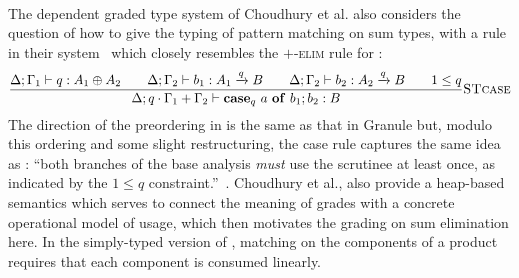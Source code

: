  \paragraph{\gradname{}}
 The dependent graded type system \gradname{} of Choudhury et al. also considers
 the question of how to give the typing of pattern matching on sum
 types, with a rule in their system~\cite[p.8]{choudhury2021} which
 closely resembles the \textsc{$+$-elim} rule for \abname{}:
 \begin{align*}
 \dfrac{
   \Delta ; \Gamma_1 \vdash q : A_1 \oplus A_2
   \qquad
   \Delta ; \Gamma_2 \vdash b_1 : A_1 \xrightarrow{q} B
   \qquad
   \Delta ; \Gamma_2 \vdash b_2 : A_2 \xrightarrow{q} B
   \qquad
   1 \leq q
 }
 {\Delta ; q \cdot \Gamma_1 + \Gamma_2 \vdash \mathbf{case}_q\ a\
   \mathbf{of}\ b_1; b_2 : B}
 \textsc{STcase}
 \end{align*}
 The direction of the preordering in \gradname{} is the same
 as that in Granule but, modulo this ordering and some slight
 restructuring, the case rule
 captures the same idea as \abname{}: ``both branches
 of the base analysis \emph{must} use the scrutinee at least once,
 as indicated by the $1 \leq q$ constraint.''~\cite[p.8]{choudhury2021}.
 Choudhury et al., also provide a heap-based semantics which serves to connect the
 meaning of grades with a concrete operational model of usage, which
 then motivates the grading on sum elimination here. %
 In the simply-typed version of \gradname{}, matching on the components
 of a product requires that each component is consumed linearly.
 
